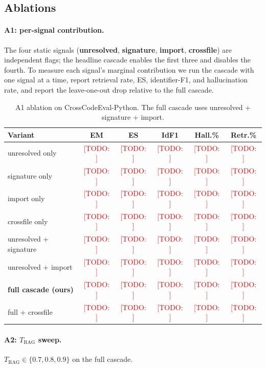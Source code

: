 \documentclass[10pt,twocolumn]{article}
\newcommand{\todo}[1]{\textcolor{red}{[TODO: #1]}}
\newcommand{\TRAG}{T_{\text{RAG}}}
\begin{document}
\subsection{Ablations}
\label{sec:ablations}

\paragraph{A1: per-signal contribution.} The four static signals
(\textbf{unresolved}, \textbf{signature}, \textbf{import},
\textbf{crossfile}) are independent flags; the headline cascade enables
the first three and disables the fourth. To measure each signal's
marginal contribution we run the cascade with one signal at a time,
report retrieval rate, ES, identifier-F1, and hallucination rate, and
report the leave-one-out drop relative to the full cascade.

\begin{table}[h]
\centering
\small
\begin{tabular}{lccccc}
\toprule
Variant & EM & ES & IdF1 & Hall.\% & Retr.\% \\
\midrule
unresolved only            & \todo{} & \todo{} & \todo{} & \todo{} & \todo{} \\
signature only             & \todo{} & \todo{} & \todo{} & \todo{} & \todo{} \\
import only                & \todo{} & \todo{} & \todo{} & \todo{} & \todo{} \\
crossfile only             & \todo{} & \todo{} & \todo{} & \todo{} & \todo{} \\
\midrule
unresolved + signature     & \todo{} & \todo{} & \todo{} & \todo{} & \todo{} \\
unresolved + import        & \todo{} & \todo{} & \todo{} & \todo{} & \todo{} \\
\textbf{full cascade (ours)} & \todo{} & \todo{} & \todo{} & \todo{} & \todo{} \\
full + crossfile           & \todo{} & \todo{} & \todo{} & \todo{} & \todo{} \\
\bottomrule
\end{tabular}
\caption{A1 ablation on CrossCodeEval-Python. The full cascade uses
unresolved + signature + import.}
\label{tab:a1_per_signal}
\end{table}

\paragraph{A2: $\TRAG$ sweep.} $\TRAG \in \{0.7, 0.8, 0.9\}$ on the
full cascade.
\end{document}

